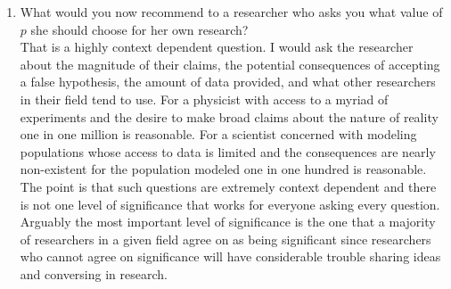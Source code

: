 \documentclass[a4paper, 12pt]{../../config/homework}
\begin{document}
\begin{enumerate}[label=\textbf{Task \arabic*}]
\item What would you now recommend to a researcher who asks you what value of \(p\) she should choose for her own research?
\\ That is a highly context dependent question. I would ask the researcher about the magnitude of their claims, the potential consequences of accepting a false hypothesis, the amount of data provided, and what other researchers in their field tend to use. For a physicist with access to a myriad of experiments and the desire to make broad claims about the nature of reality one in one million is reasonable. For a scientist concerned with modeling populations whose access to data is limited and the consequences are nearly non-existent for the population modeled one in one hundred is reasonable. The point is that such questions are extremely context dependent and there is not one level of significance that works for everyone asking every question. Arguably the most important level of significance is the one that a majority of researchers in a given field agree on as being significant since researchers who cannot agree on significance will have considerable trouble sharing ideas and conversing in research.

\end{enumerate}
\end{document}
